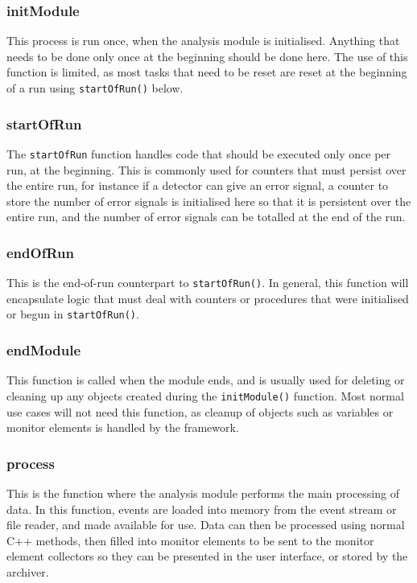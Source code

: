 \subsubsection{initModule}
This process is run once, when the analysis module is initialised. Anything that needs to be done only once at the beginning should be done here. The use of this function is limited, as most tasks that need to be reset are reset at the beginning of a run using \texttt{startOfRun()} below.

\subsubsection{startOfRun}
The \texttt{startOfRun} function handles code that should be executed only once per run, at the beginning. This is commonly used for counters that must persist over the entire run, for instance if a detector can give an error signal, a counter to store the number of error signals is initialised here so that it is persistent over the entire run, and the number of error signals can be totalled at the end of the run.

\subsubsection{endOfRun}
This is the end-of-run counterpart to \texttt{startOfRun()}. In general, this function will encapsulate logic that must deal with counters or procedures that were initialised or begun in \texttt{startOfRun()}.

\subsubsection{endModule}
This function is called when the module ends, and is usually used for deleting or cleaning up any objects created during the \texttt{initModule()} function. Most normal use cases will not need this function, as cleanup of objects such as variables or monitor elements is handled by the framework.

\subsubsection{process}
This is the function where the analysis module performs the main processing of data. In this function, events are loaded into memory from the event stream or file reader, and made available for use. Data can then be processed using normal C++ methods, then filled into monitor elements to be sent to the monitor element collectors so they can be presented in the user interface, or stored by the archiver.

